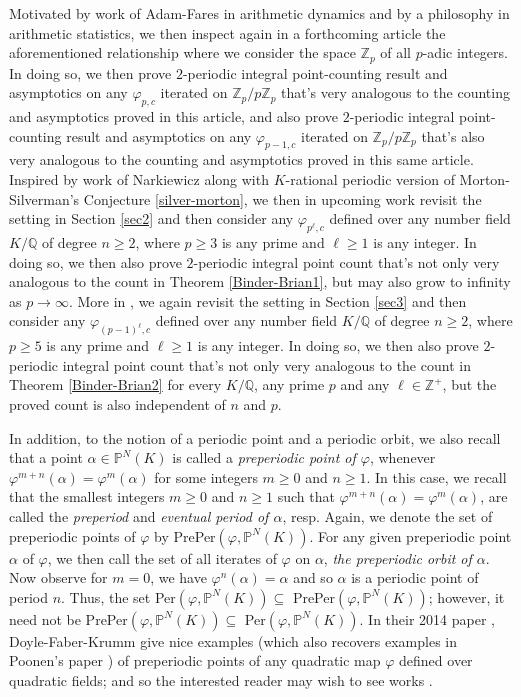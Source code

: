 \documentclass{article}
\theoremstyle{plain}
\theoremstyle{definition}
\begin{document}
Motivated by work of Adam-Fares \cite{Ada} in arithmetic dynamics and by a  philosophy in arithmetic statistics, we then inspect again in a forthcoming article \cite{BK33} the aforementioned relationship where we consider the space $\mathbb{Z}_{p}$ of all $p$-adic integers. In doing so, we then prove $2$-periodic integral point-counting result and asymptotics on any $\varphi_{p,c}$ iterated on $\mathbb{Z}_{p}\slash p\mathbb{Z}_{p}$ that's very analogous to the counting and asymptotics proved in this article, and also prove $2$-periodic integral point-counting result and asymptotics on any $\varphi_{p-1,c}$ iterated on $\mathbb{Z}_{p}\slash p\mathbb{Z}_{p}$ that's also very analogous to the counting and asymptotics proved in this same article. Inspired by work of Narkiewicz \cite{Narkie1} along with $K$-rational periodic version of Morton-Silverman's Conjecture \ref{silver-morton}, we then in upcoming work \cite{BK22} revisit the setting in Section \ref{sec2} and then consider any $\varphi_{p^{\ell},c}$ defined over any number field $K\slash \mathbb{Q}$ of degree $n\geq 2$, where $p\geq 3$ is any prime and $\ell \geq 1$ is any integer. In doing so, we then also prove $2$-periodic integral point count that's not only very analogous to the count in Theorem \ref{Binder-Brian1}, but may also grow to infinity as $p\to \infty$. More in \cite{BK22}, we again revisit the setting in Section \ref{sec3} and then consider any $\varphi_{(p-1)^{\ell},c}$ defined over any number field $K\slash \mathbb{Q}$ of degree $n\geq 2$, where $p\geq 5$ is any prime and $\ell \geq 1$ is any integer. In doing so, we then also prove $2$-periodic integral point count that's not only very analogous to the count in Theorem \ref{Binder-Brian2} for every $K\slash \mathbb{Q}$, any prime $p$ and any $\ell\in \mathbb{Z}^{+}$, but the proved count is also independent of $n$ and $p$. 

In addition, to the notion of a periodic point and a periodic orbit, we also recall that a point $\alpha\in {\mathbb{P}^N(K)}$ is called a \textit{preperiodic point of $\varphi$}, whenever $\varphi^{m+n}(\alpha) = \varphi^{m}(\alpha)$ for some integers $m\geq 0$ and $n\geq 1$. In this case, we recall that the smallest integers $m\geq 0$ and $n\geq 1$ such that $\varphi^{m+n}(\alpha) = \varphi^{m}(\alpha)$, are called the \textit{preperiod} and \textit{eventual period of $\alpha$}, resp. Again, we denote the set of preperiodic points of $\varphi$ by PrePer$(\varphi, {\mathbb{P}^N(K)})$. For any given preperiodic point $\alpha$ of $\varphi$, we then call the set of all iterates of $\varphi$ on $\alpha$, \textit{the preperiodic orbit of $\alpha$}.
Now observe for $m=0$, we have $\varphi^{n}(\alpha) = \alpha $ and so $\alpha$ is a periodic point of period $n$. Thus, the set  Per$(\varphi, {\mathbb{P}^N(K)}) \subseteq$ PrePer$(\varphi, {\mathbb{P}^N(K)})$; however, it need not be PrePer$(\varphi, {\mathbb{P}^N(K)})\subseteq$ Per$(\varphi, {\mathbb{P}^N(K)})$. In their 2014 paper \cite{Doyle}, Doyle-Faber-Krumm give nice examples (which also recovers examples in Poonen's paper \cite{Poonen}) of preperiodic points of any quadratic map $\varphi$ defined over quadratic fields; and so the interested reader may wish to see works \cite{Poonen, Doyle}. 
\end{document}
